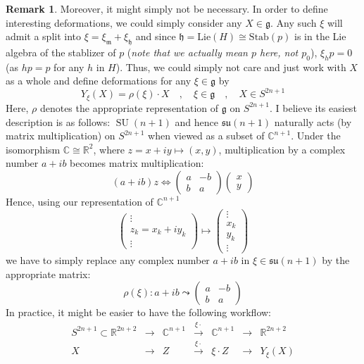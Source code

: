 \documentclass[a4paper,11pt]{article}
\theoremstyle{definition}
\newtheorem{remark}{Remark}
\newcommand{\RR}{\mathbb{R}}
\newcommand{\CC}{\mathbb{C}}
\DeclareMathOperator{\SU}{SU}
\newcommand{\g}{\mathfrak{g}}
\newcommand{\h}{\mathfrak{h}}
\newcommand{\m}{\mathfrak{m}}
\newcommand{\su}{\mathfrak{su}}
\newcommand{\mat}[4]{\begin{pmatrix} #1 & #2 \\ #3 & #4 \end{pmatrix}}
\newcommand{\vek}[2]{\begin{pmatrix} #1 \\ #2 \end{pmatrix}}
\begin{document}
\begin{remark}
  Moreover, it might simply not be necessary.
  In order to define interesting deformations, we could simply consider any $X \in \g$.
  Any such $\xi$ will admit a split into $\xi = \xi_{\m} + \xi_{\h}$ and since $\h = \text{Lie}(H) \cong \text{Stab}(p)$ is in the Lie algebra of the stablizer of $p$ (\emph{note that we actually mean $p$ here, not $p_0$}), $\xi_h p = 0$ (as $hp = p$ for any $h$ in $H$).
  Thus, we could simply not care and just work with $X$ as a whole and define deformations for any $\xi\in\g$ by 
  \begin{equation}
    Y_{\xi}(X) = \rho(\xi)\cdot X \quad , \quad \xi \in \g \quad , \quad X \in S^{2n + 1} 
  \end{equation}
  Here, $\rho$ denotes the appropriate representation of $\g$ on $S^{2n+1}$.
  I believe its easiest description is as follows: $\SU(n+1)$ and hence $\su(n+1)$ naturally acts (by matrix multiplication) on $S^{2n+1}$ when viewed as a subset of $\CC^{n+1}$. 
  Under the isomorphism $\CC \cong \RR^2$, where $z = x + iy \mapsto (x, y)$, multiplication by a complex number $a + i b$ becomes matrix multiplication:
  \begin{equation}
    (a + i b) z \iff \mat{a}{-b}{b}{a} \vek{x}{y}
  \end{equation}
  Hence, using our representation of $\CC^{n+1}$
  \begin{equation}
    \begin{pmatrix} \vdots \\ z_k = x_k + i y_k \\ \vdots \end{pmatrix} \mapsto \begin{pmatrix} \vdots \\  x_k \\ y_k \\ \vdots \end{pmatrix}
  \end{equation}
  we have to simply replace any complex number $a + i b$ in $\xi \in \su(n+1)$ by the appropriate matrix:
  \begin{equation}
    \rho(\xi) \colon a + i b \leadsto \mat{a}{-b}{b}{a}
  \end{equation}
  In practice, it might be easier to have the following workflow:
  \begin{equation}
    \begin{matrix}
      S^{2n+1} \subset \RR^{2n + 2} & \longrightarrow & \CC^{n+1} & \stackrel{\xi \cdot}{\longrightarrow} & \CC^{n+1} & \longrightarrow & \RR^{2n + 2} \\
      X & \longrightarrow & Z & \stackrel{\xi \cdot}{\longrightarrow} & \xi \cdot Z & \longrightarrow & Y_{\xi}(X)
    \end{matrix}
  \end{equation}
\end{remark}
\end{document}
